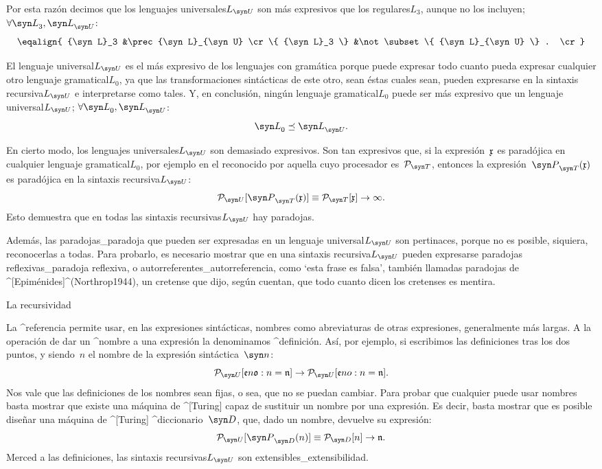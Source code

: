 Por esta razón decimos que los \mental lenguajes universales$L_{\syn
U}$ son más expresivos que los \mental regulares$L_3$, aunque no los
incluyen; $\forall{\syn L}_3,{\syn L}_{\syn U}$:
$$\eqalign{
   {\syn L}_3 &\prec {\syn L}_{\syn U} \cr
   \{ {\syn L}_3 \} &\not\subset \{ {\syn L}_{\syn U} \}  . \cr
 }$$

El \mental lenguaje universal$L_{\syn U}$ es el más expresivo de los
lenguajes con gramática porque puede expresar todo cuanto pueda expresar
cualquier otro \mental lenguaje gramatical$L_0$, ya que las
transformaciones sintácticas de este otro, sean éstas cuales sean,
pueden expresarse en la \mental sintaxis recursiva$L_{\syn U}$ e
interpretarse como tales. Y, en conclusión, ningún \mental lenguaje
gramatical$L_0$ puede ser más expresivo que un \mental lenguaje
universal$L_{\syn U}$; $\forall{\syn L}_0,{\syn L}_{\syn U}$:
$${\syn L}_0 \preceq {\syn L}_{\syn U} .$$

En cierto modo, los \mental lenguajes universales$L_{\syn U}$ son
demasiado expresivos. Son tan expresivos que, si la expresión~$\frak x$
es paradójica en cualquier \Mental lenguaje gramatical$L_0$, por ejemplo
en el reconocido por aquella {\TM} cuyo procesador es~${\cal P}_{\syn
T}$, entonces la expresión~${\syn P}_{\syn T}({\frak x})$ es paradójica
en la \Mental sintaxis recursiva$L_{\syn U}$:
$$ {\cal P}_{\syn U}[{\syn P}_{\syn T}({\frak x})] \equiv
   {\cal P}_{\syn T}[{\frak x}] \rightarrow \infty .$$
Esto demuestra que en todas las \mental sintaxis recursivas$L_{\syn U}$
hay paradojas.

Además, las paradojas_{paradoja} que pueden ser expresadas en un \Mental
lenguaje universal$L_{\syn U}$ son pertinaces, porque no es posible,
siquiera, reconocerlas a todas. Para probarlo, es necesario mostrar que
en una \mental sintaxis recursiva$L_{\syn U}$ pueden expresarse
paradojas reflexivas_{paradoja reflexiva}, o
autorreferentes_{autorreferencia}, como `esta frase es falsa', también
llamadas paradojas de ^[Epiménides]^(Northrop1944), un cretense que
dijo, según cuentan, que todo cuanto dicen los cretenses es mentira.


\Section La recursividad

La ^{referencia} permite usar, en las expresiones sintácticas, nombres
como abreviaturas de otras expresiones, generalmente más largas. A la
operación de dar un ^{nombre} a una expresión la denominamos
^{definición}. Así, por ejemplo, si escribimos las definiciones tras los
dos puntos, y siendo~$n$ el nombre de la expresión sintáctica~$\syn n$:
$$ {\cal P}_{\syn U}[{\frak e} n {\frak o} : n = {\frak n} ]
   \rightarrow
   {\cal P}_{\syn U}[{\frak eno} : n = {\frak n} ] .$$
Nos vale que las definiciones de los nombres sean fijas, o sea, que no
se puedan cambiar. Para probar que cualquier {\UTM} puede usar nombres
basta mostrar que existe una máquina de ^[Turing] capaz de sustituir un
nombre por una expresión. Es decir, basta mostrar que es posible diseñar
una máquina de ^[Turing] ^{diccionario}~$\syn D$, que, dado un nombre,
devuelve su expresión:
$$ {\cal P}_{\syn U}[{\syn P}_{\syn D}(n)] \equiv
   {\cal P}_{\syn D}[n] \rightarrow {\frak n} .$$
Merced a las definiciones, las \mental sintaxis recursivas$L_{\syn U}$
son extensibles_{extensibilidad}.


